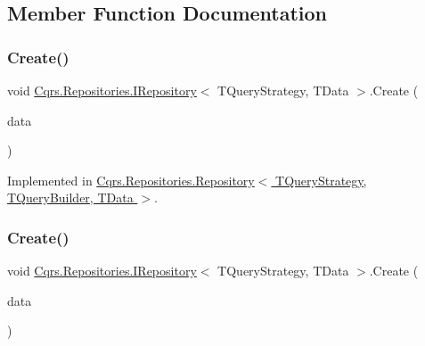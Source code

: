 \subsection{Member Function Documentation}
\mbox{\label{interfaceCqrs_1_1Repositories_1_1IRepository_a240c8d094207a22b0c805a5c830d8615_a240c8d094207a22b0c805a5c830d8615}} 
\subsubsection{\texorpdfstring{Create()}{Create()}\hspace{0.1cm}{\footnotesize\ttfamily [1/2]}}
{\footnotesize\ttfamily void \hyperlink{interfaceCqrs_1_1Repositories_1_1IRepository}{Cqrs.\+Repositories.\+I\+Repository}$<$ T\+Query\+Strategy, T\+Data $>$.Create (\begin{DoxyParamCaption}\item[{T\+Data}]{data }\end{DoxyParamCaption})}



Implemented in \hyperlink{classCqrs_1_1Repositories_1_1Repository_a5d5d78262533aa2ab32eddbab83869bd_a5d5d78262533aa2ab32eddbab83869bd}{Cqrs.\+Repositories.\+Repository$<$ T\+Query\+Strategy, T\+Query\+Builder, T\+Data $>$}.

\mbox{\label{interfaceCqrs_1_1Repositories_1_1IRepository_ae3481fb2ecb0146308e07a9dd6af8c14_ae3481fb2ecb0146308e07a9dd6af8c14}} 
\subsubsection{\texorpdfstring{Create()}{Create()}\hspace{0.1cm}{\footnotesize\ttfamily [2/2]}}
{\footnotesize\ttfamily void \hyperlink{interfaceCqrs_1_1Repositories_1_1IRepository}{Cqrs.\+Repositories.\+I\+Repository}$<$ T\+Query\+Strategy, T\+Data $>$.Create (\begin{DoxyParamCaption}\item[{I\+Enumerable$<$ T\+Data $>$}]{data }\end{DoxyParamCaption})}



